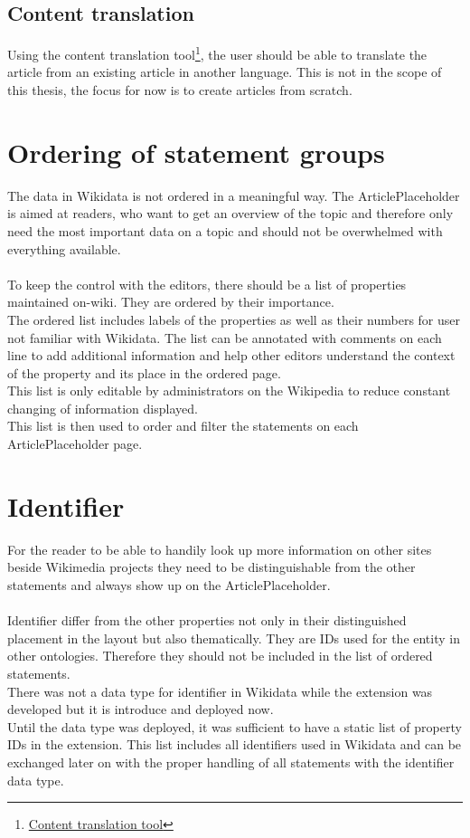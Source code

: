 \subsection{Content translation}
Using the content translation tool\footnote{\href{https://www.mediawiki.org/wiki/Content_translation}{Content translation tool}}, the user should be able to translate the article from an existing article in another language. This is not in the scope of this thesis, the focus for now is to create articles from scratch. \\

\section{Ordering of statement groups}
The data in Wikidata is not ordered in a meaningful way. The ArticlePlaceholder is aimed at readers, who want to get an overview of the topic and therefore only need the most important data on a topic and should not be overwhelmed with everything available. \\
\\
To keep the control with the editors, there should be a list of properties maintained on-wiki. They are ordered by their importance. \\
The ordered list includes labels of the properties as well as their numbers for user not familiar with Wikidata. The list can be annotated with comments on each line to add additional information and help other editors understand the context of the property and its place in the ordered page. \\
This list is only editable by administrators on the Wikipedia to reduce constant changing of information displayed. \\
This list is then used to order and filter the statements on each ArticlePlaceholder page. 

\section {Identifier}
For the reader to be able to handily look up more information on other sites beside Wikimedia projects they need to be distinguishable from the other statements and always show up on the ArticlePlaceholder. \\
\\
Identifier differ from the other properties not only in their distinguished placement in the layout but also thematically. They are IDs used for the entity in other ontologies. Therefore they should not be included in the list of ordered statements. \\
There was not a data type for identifier in Wikidata while the extension was developed but it is introduce and deployed now. \\
Until the data type was deployed, it was sufficient to have a static list of property IDs in the extension. This list includes all identifiers used in Wikidata and can be exchanged later on with the proper handling of all statements with the identifier data type.

